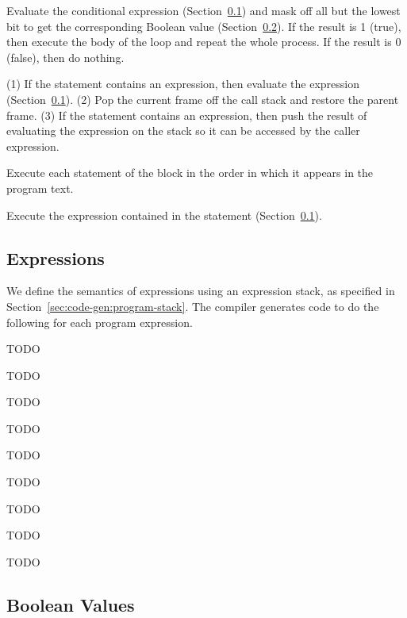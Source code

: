 \documentclass[10pt]{article}
\begin{document}
 Evaluate the conditional expression
(Section~\ref{sec:code-gen:expressions}) and mask off all but the
lowest bit to get the corresponding Boolean value
(Section~\ref{sec:code-gen:boolean}).  If the result is 1 (true), then
execute the body of the loop and repeat the whole process.  If the
result is 0 (false), then do nothing.

 (1) If the statement contains an
expression, then evaluate the expression
(Section~\ref{sec:code-gen:expressions}).  (2) Pop the current frame
off the call stack and restore the parent frame.  (3) If the statement
contains an expression, then push the result of evaluating the
expression on the stack so it can be accessed by the caller
expression.

 Execute each statement of the block in the
order in which it appears in the program text.

 Execute the expression contained in
the statement (Section~\ref{sec:code-gen:expressions}).

\subsection{Expressions}
\label{sec:code-gen:expressions}

We define the semantics of expressions using an expression stack, as
specified in Section~\ref{sec:code-gen:program-stack}.  The compiler
generates code to do the following for each program expression.

 TODO

 TODO

 TODO

 TODO

 TODO

 TODO

 TODO

 TODO

 TODO


\subsection{Boolean Values}
\label{sec:code-gen:boolean}
\end{document}
